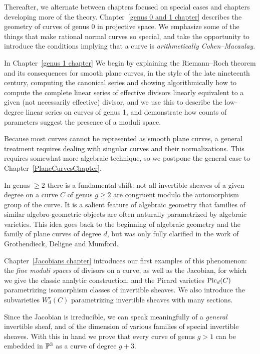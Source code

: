 Thereafter, we alternate between chapters focused on special cases and
chapters developing more of the theory. Chapter~\ref{genus 0 and 1 chapter}  
describes the geometry of curves of genus 0  in projective
space. We emphasize some of the things that make rational normal
curves so special, and take the opportunity to introduce the
conditions implying that a curve is \emph{arithmetically Cohen--Macaulay}.

In Chapter~\ref{genus 1 chapter} We begin by explaining the
Riemann--Roch theorem and its consequences for smooth plane curves,  in
the style of the late 
nineteenth
century, computing the canonical series and showing algorithmically how to compute the complete linear series of effective divisors linearly equivalent to a given (not necessarily effective) divisor, and we use this 
to describe the low-degree linear series on curves of genus 1, and demonstrate how counts of parameters suggest the presence of a moduli space.

Because most curves cannot be represented as smooth plane curves, a general treatment requires dealing with
singular curves and their normalizations. This requires somewhat more algebraic technique, so we postpone the general case to Chapter~\ref{PlaneCurvesChapter}.  

In genus $\geq 2$ there is a fundamental shift: not all invertible sheaves of a given degree on a curve $C$ of genus $g \geq 2$ are congruent modulo the automorphism group of the curve.
It is a salient feature of algebraic geometry that families of similar algebro-geometric objects are often naturally parametrized by algebraic varieties. This idea goes back to the beginning of algebraic geometry and the family of plane curves of degree $d$, but was only fully clarified in the work of Grothendieck, Deligne and Mumford.
%
%
%

Chapter~\ref{Jacobians chapter} introduces our first examples of this phenomenon: the \emph{fine moduli spaces} of divisors on a curve, as well as the Jacobian, for which we give the classic analytic construction, and the Picard varieties $\Pic_d(C)$ parametrizing isomorphism classes of invertible sheaves. We also introduce the subvarieties $W^{r}_{d}(C)$ parametrizing invertible sheaves with many sections. 

 Since the Jacobian is irreducible, we can speak meaningfully of a \emph{general} invertible sheaf, and of the dimension of various families of special invertible sheaves. With this in hand we prove
that every curve of genus $g>1$ can be embedded in $\PP^{3}$ as a curve of degree $g+3$.

